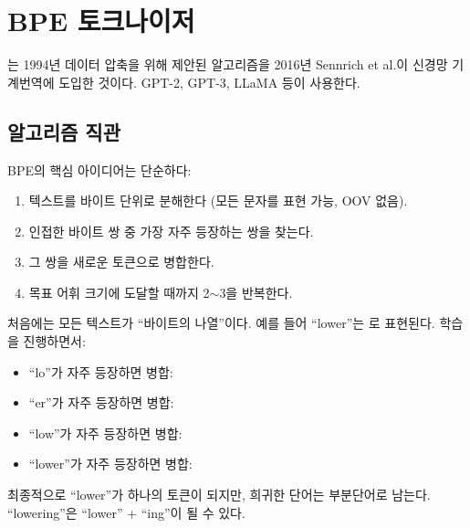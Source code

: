\section{BPE 토크나이저}

는 1994년 데이터 압축을 위해 제안된 알고리즘을 2016년 Sennrich et al.이 신경망 기계번역에 도입한 것이다. GPT-2, GPT-3, LLaMA 등이 사용한다.

\subsection{알고리즘 직관}

BPE의 핵심 아이디어는 단순하다:
\begin{enumerate}
  \item 텍스트를 바이트 단위로 분해한다 (모든 문자를 표현 가능, OOV 없음).
  \item 인접한 바이트 쌍 중 가장 자주 등장하는 쌍을 찾는다.
  \item 그 쌍을 새로운 토큰으로 병합한다.
  \item 목표 어휘 크기에 도달할 때까지 2$\sim$3을 반복한다.
\end{enumerate}

처음에는 모든 텍스트가 ``바이트의 나열''이다. 예를 들어 ``lower''는 \code{[l, o, w, e, r]}로 표현된다. 학습을 진행하면서:
\begin{itemize}
  \item ``lo''가 자주 등장하면 병합: \code{[lo, w, e, r]}
  \item ``er''가 자주 등장하면 병합: \code{[lo, w, er]}
  \item ``low''가 자주 등장하면 병합: \code{[low, er]}
  \item ``lower''가 자주 등장하면 병합: \code{[lower]}
\end{itemize}

최종적으로 ``lower''가 하나의 토큰이 되지만, 희귀한 단어는 부분단어로 남는다. ``lowering''은 ``lower'' + ``ing''이 될 수 있다.

